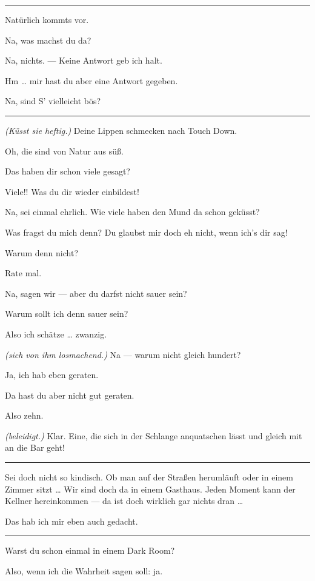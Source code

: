 \documentclass[
	final,
	a4paper,
	ngerman,
	mpinclude = true, %
	twoside = true,
	open = right,
	cleardoublepage = plain,
	DIV = 13,
	BCOR = 1cm,
	titlepage = firstiscover,
	]{scrbook}
\newcommand{\direction}[1]{\textit{(#1)}}
\newenvironment{deletion}{%
		\vspace{0.25\baselineskip}
		\hrule
		\vspace{0.25\baselineskip}
		\color{darkgray}
	}{
		\color{black}
		\vspace{0.25\baselineskip}
		\hrule 
		\vspace{0.25\baselineskip}
	}
\newcommand{\thecharacter}[1]{\textup{\textsc{#1}}\xspace}
\newcommand{\thegatte}{\thecharacter{Christian}}
\newcommand{\thesuesse}{\thecharacter{Lola}}
\newcommand{\character}[1]{\item[#1:]}
\newcommand{\gatte}{\character{\thegatte}}
\newcommand{\suesse}{\character{\thesuesse}}
\begin{document}
\begin{play}
\begin{deletion}
	\suesse
	Natürlich kommts vor.

	\gatte
	Na, was machst du da?

	\suesse
	Na, nichts. --- Keine Antwort geb ich halt.

	\gatte
	Hm \ldots{} mir hast du aber eine Antwort gegeben.

	\suesse
	Na, sind S' vielleicht bös?

	\gatte
	\end{deletion}
	\direction{Küsst sie heftig.} Deine Lippen schmecken nach Touch Down.

	\suesse
	Oh, die sind von Natur aus süß.

	\gatte
	Das haben dir schon viele gesagt?

	\suesse
	Viele!! Was du dir wieder einbildest!

	\gatte
	Na, sei einmal ehrlich. Wie viele haben den Mund da schon geküsst?

	\suesse
	Was fragst du mich denn? Du glaubst mir doch eh nicht, wenn ich's dir sag!

	\gatte
	Warum denn nicht?

	\suesse
	Rate mal.

	\gatte
	Na, sagen wir --- aber du darfst nicht sauer sein?

	\suesse
	Warum sollt ich denn sauer sein?

	\gatte
	Also ich schätze \ldots{} zwanzig.

	\suesse
	\direction{sich von ihm losmachend.} Na --- warum nicht gleich hundert?

	\gatte
	Ja, ich hab eben geraten.

	\suesse
	Da hast du aber nicht gut geraten.

	\gatte
	Also zehn.

	\suesse
	\direction{beleidigt.} Klar. Eine, die sich in der Schlange anquatschen lässt und gleich mit an die Bar geht!

	\begin{deletion}
	\gatte
	Sei doch nicht so kindisch. Ob man auf der Straßen herumläuft oder in einem Zimmer sitzt \ldots{} Wir sind doch da in einem Gasthaus. Jeden Moment kann der Kellner hereinkommen --- da ist doch wirklich gar nichts dran \ldots{}

	\suesse
	Das hab ich mir eben auch gedacht.
	\end{deletion}

	\gatte
	Warst du schon einmal in einem Dark Room?

	\suesse
	Also, wenn ich die Wahrheit sagen soll: ja.


\end{play}
\end{document}
